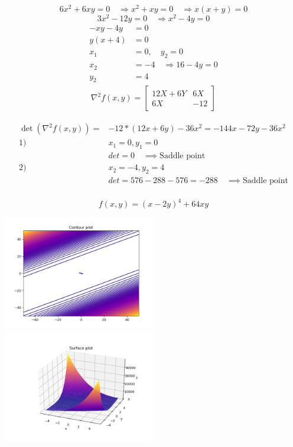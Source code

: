 \documentclass[12pt]{article}         %
\begin{document}
$$
6x^2+6xy=0 \quad\Rightarrow x^2+xy=0 \quad\Rightarrow x(x+y)=0 %
$$
$$
3x^2-12y=0 \quad\Rightarrow x^2-4y=0
$$
$$
\begin{aligned}
-xy-4y&=0\\
y(x+4)&=0\\
x_1&=0, \quad y_2=0\\
x_2&=-4 \quad\Rightarrow 16-4y=0\\
y_2&=4
\end{aligned}
$$
\begin{gather}
\nabla^2 f(x,y) = 
  \begin{bmatrix}
  12 X + 6Y &
   6X\\
   6X &
   -12 
   \end{bmatrix}
    \nonumber %
\end{gather}


$$
\begin{aligned}
\det\left(\nabla^2 f(x,y)\right)=&-12*(12x+6y) - 36x^2= -144x-72y-36x^2\\
1)\: &x_1=0, y_1=0\\
&det=0 \quad\implies \text{Saddle point} \\ %
2)\: &x_2=-4, y_2=4\\
&det=576-288-576=-288 \quad\implies \text{Saddle point}
\end{aligned}
$$\\

\begin{equation}
	f(x,y) = (x - 2y)^4 + 64xy
\end{equation}

\includegraphics[width=0.5\textwidth]{Figure_2}
\includegraphics[width=0.5\textwidth]{Surface_2}
\end{document}
